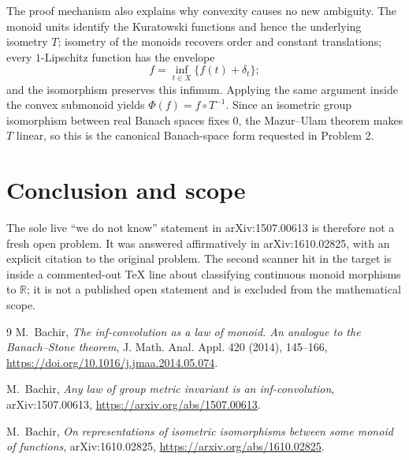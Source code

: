 \documentclass[11pt]{article}
\begin{document}
The proof mechanism also explains why convexity causes no new ambiguity.
The monoid units identify the Kuratowski functions and hence the underlying
isometry $T$; isometry of the monoids recovers order and constant
translations; every $1$-Lipschitz function has the envelope
\[
 f=\inf_{t\in X}\{f(t)+\delta_t\};
\]
and the isomorphism preserves this infimum.  Applying the same argument
inside the convex submonoid yields $\Phi(f)=f\circ T^{-1}$.  Since an
isometric group isomorphism between real Banach spaces fixes $0$, the
Mazur--Ulam theorem makes $T$ linear, so this is the canonical Banach-space
form requested in Problem 2.

\section*{Conclusion and scope}

The sole live ``we do not know'' statement in arXiv:1507.00613 is therefore
not a fresh open problem.  It was answered affirmatively in
arXiv:1610.02825, with an explicit citation to the original problem.  The
second scanner hit in the target is inside a commented-out TeX line about
classifying continuous monoid morphisms to $\mathbb R$; it is not a
published open statement and is excluded from the mathematical scope.

\begin{thebibliography}{9}
M.~Bachir,
\emph{The inf-convolution as a law of monoid. An analogue to the
Banach--Stone theorem},
J. Math. Anal. Appl. 420 (2014), 145--166,
\url{https://doi.org/10.1016/j.jmaa.2014.05.074}.

M.~Bachir,
\emph{Any law of group metric invariant is an inf-convolution},
arXiv:1507.00613,
\url{https://arxiv.org/abs/1507.00613}.

M.~Bachir,
\emph{On representations of isometric isomorphisms between some monoid of
functions},
arXiv:1610.02825,
\url{https://arxiv.org/abs/1610.02825}.
\end{thebibliography}
\end{document}
